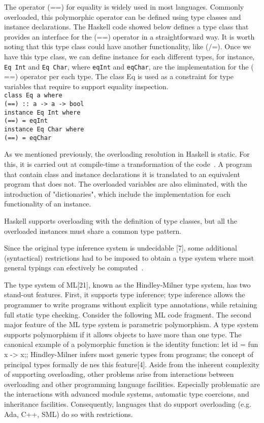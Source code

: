 \documentclass[hidelinks, twocolumn]{article}
\begin{document}
The operator ($\texttt{==}$) for equality is widely used in most languages. Commonly overloaded, this polymorphic operator can be defined using type classes and instance declarations. The Haskell code showed below defines a type class that provides an interface for the ($\texttt{==}$) operator in a straightforward way. It is worth noting that this type class could have another functionality, like ($\texttt{/=}$). Once we have this type class, we can define instance for each different types, for instance,  \texttt{Eq Int} and \texttt{Eq Char}, where \texttt{eqInt} and \texttt{eqChar}, are the implementation for the ($\texttt{==}$) operator per each type. The class Eq is used as a constraint for  type variables  that require to support equality inspection.\\

\texttt{class Eq a where\\
(==) :: a -> a -> bool\\
instance Eq Int where\\
(==) = eqInt\\
instance Eq Char where\\
(==) = eqChar \\}

As we mentioned previously, the overloading resolution in Haskell is static. For this, it is carried out 
at compile-time a transformation of the code~\cite{wadlerBlott:popl89}. A program that contain class and instance declarations it is translated to an equivalent program that does not. The overloaded variables are also eliminated, with the introduction of "dictionaries", which include the implementation for each functionality of an instance.   

Haskell supports overloading with the definition of type classes, but all the overloaded instances must share a common type pattern.

Since the original type inference system is undecidable [7], some additional (syntactical) restrictions had to be imposed to obtain a type system where most general typings can efectively be computed~\cite{SEIDL199457}.

The type system of ML[21], known as the Hindley-Milner type system, has two stand-out features. First, it supports type inference; type inference allows the programmer to write programs without explicit type annotations, while retaining full static type checking. Consider the following ML code fragment. The second major feature of the ML type system is parametric polymorphism. A type system supports polymorphism if it allows objects to have more than one type. The canonical example of a polymorphic function is the identity function:
let id = fun x -> x;; Hindley-Milner infers most generic types
from programs; the concept of principal types formally denes this feature[4].
Aside from the inherent complexity of supporting
overloading, other problems arise from interactions between overloading and
other programming language facilities. Especially problematic are the interactions
with advanced module systems, automatic type coercions, and inheritance facilities.
Consequently, languages that do support overloading (e.g. Ada, C++, SML) do so
with restrictions.
\end{document}
